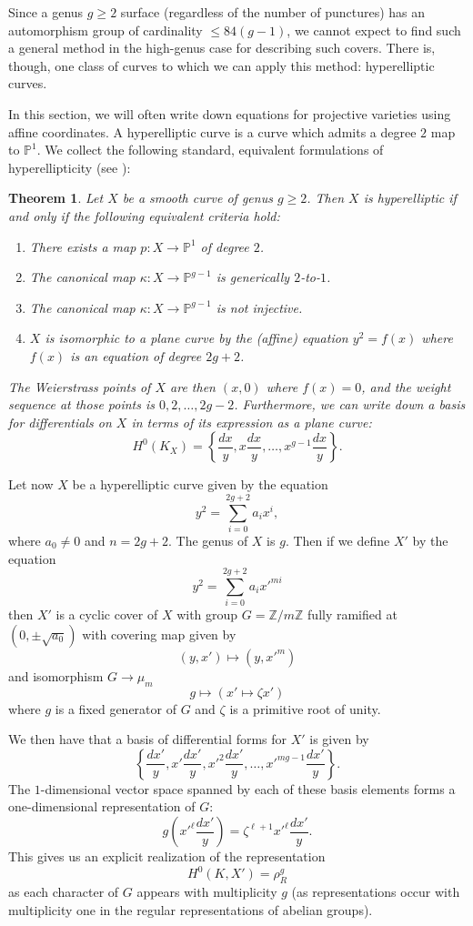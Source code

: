 \documentclass[11pt]{amsart}
\newtheorem{thm}{Theorem}
\numberwithin{thm}{section}
\begin{document}
Since a genus $g\geq 2$ surface (regardless of the number of punctures) has an automorphism group of cardinality $\leq 84(g-1)$, we cannot expect to find such a general method in the high-genus case for describing such covers.  There is, though, one class of curves to which we can apply this method: hyperelliptic curves.

In this section, we will often write down equations for projective varieties using affine coordinates. A hyperelliptic curve is a curve which admits a degree $2$ map to $\mathbb{P}^1$.  We collect the following standard, equivalent formulations of hyperellipticity (see \cite{ACGH}):
\begin{thm}
Let $X$ be a smooth curve of genus $g \geq 2$.  Then $X$ is hyperelliptic if and only if the following equivalent criteria hold:
\begin{enumerate}
\item There exists a map $p: X\rightarrow \mathbb{P}^1$ of degree $2$.
\item The canonical map $\kappa: X\rightarrow \mathbb{P}^{g-1}$ is generically $2$-to-$1$.
\item The canonical map $\kappa: X\rightarrow \mathbb{P}^{g-1}$ is not injective.
\item $X$ is isomorphic to a plane curve by the (affine) equation $y^2 = f(x)$ where $f(x)$ is an equation of degree $2g+2$.
\end{enumerate}
The Weierstrass points of $X$ are then $(x, 0)$ where $f(x) = 0$, and the weight sequence at those points is $0, 2, \dots, 2g-2$.  Furthermore, we can write down a basis for differentials on $X$ in terms of its expression as a plane curve:
\[
H^0(K_X) = \left\{\frac{dx}{y}, x\frac{dx}{y}, \dots, x^{g-1}\frac{dx}{y}\right\}.
\]
\end{thm}

Let now $X$ be a hyperelliptic curve given by the equation
\[
y^2 = \sum_{i=0}^{2g+2} a_i x^i,
\]
where $a_0 \neq 0$ and $n = 2g + 2$.  The genus of $X$ is $g$.  Then if we define $X'$ by the equation
\[
y^2 = \sum_{i=0}^{2g+2} a_i x'^{mi}
\]
then $X'$ is a cyclic cover of $X$ with group $G = \mathbb{Z}/m\mathbb{Z}$ fully ramified at $(0, \pm \sqrt{a_0})$ with covering map given by
\[
(y,x') \mapsto (y,x'^m)
\]
and isomorphism $G \rightarrow \mu_m$
\[
g \mapsto (x' \mapsto \zeta x')
\]
where $g$ is a fixed generator of $G$ and $\zeta$ is a primitive root of unity.

We then have that a basis of differential forms for $X'$ is given by
\[
\left\{\frac{dx'}{y}, x'\frac{dx'}{y}, x'^2 \frac{dx'}{y}, \dots, x'^{mg-1}\frac{dx'}{y}\right\}.
\]
The $1$-dimensional vector space spanned by each of these basis elements forms a one-dimensional representation of $G$:
\[
g(x'^\ell \frac{dx'}{y}) = \zeta^{\ell+1}x'^\ell\frac{dx'}{y}.
\]
This gives us an explicit realization of the representation
\[
H^0(K, X') = \rho_R^g
\]
as each character of $G$ appears with multiplicity $g$ (as representations occur with multiplicity one in the regular representations of abelian groups).
\end{document}
